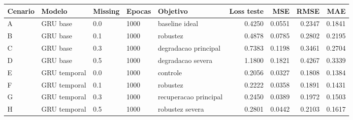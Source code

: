 \begin{tabular}{lllllrrrr}
\hline
Cenario & Modelo & Missing & Epocas & Objetivo & Loss teste & MSE & RMSE & MAE \\
\hline
A & GRU base & 0.0 & 1000 & baseline ideal & 0.4250 & 0.0551 & 0.2347 & 0.1841 \\
B & GRU base & 0.1 & 1000 & robustez & 0.4878 & 0.0785 & 0.2802 & 0.2195 \\
C & GRU base & 0.3 & 1000 & degradacao principal & 0.7383 & 0.1198 & 0.3461 & 0.2704 \\
D & GRU base & 0.5 & 1000 & degradacao severa & 1.1800 & 0.1821 & 0.4267 & 0.3339 \\
E & GRU temporal & 0.0 & 1000 & controle & 0.2056 & 0.0327 & 0.1808 & 0.1384 \\
F & GRU temporal & 0.1 & 1000 & robustez & 0.2222 & 0.0358 & 0.1891 & 0.1431 \\
G & GRU temporal & 0.3 & 1000 & recuperacao principal & 0.2450 & 0.0389 & 0.1972 & 0.1503 \\
H & GRU temporal & 0.5 & 1000 & robustez severa & 0.2801 & 0.0442 & 0.2103 & 0.1617 \\
\hline
\end{tabular}
